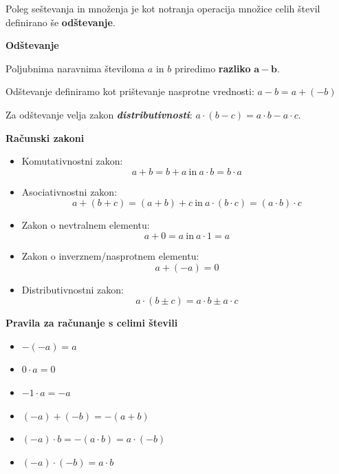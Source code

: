         \begin{frame}

            Poleg seštevanja in množenja je kot notranja operacija množice celih števil
            definirano še \textbf{odštevanje}.

            \bigskip
            \textbf{\large{Odštevanje}}
            
            \bigskip
            Poljubnima naravnima številoma $a$ in $b$ priredimo \textbf{razliko} $\mathbf{a - b}$.
            
            \bigskip
            Odštevanje definiramo kot prištevanje nasprotne vrednosti: $a-b = a+(-b)$

            \bigskip
            Za odštevanje velja zakon \textit{\textbf{distributivnosti}}: $a \cdot (b-c) = a \cdot b - a
            \cdot c$.

        \end{frame}

        \begin{frame}
            \textbf{\large{Računski zakoni}}

            \smallskip
            \begin{itemize}
                \item Komutativnostni zakon: $$a+b = b+a ~\text{in}~ a \cdot b = b \cdot a$$
                \item Asociativnostni zakon: $$a+(b+c) = (a+b)+c ~\text{in}~ a \cdot (b \cdot c) = (a \cdot b) \cdot c$$
                \item Zakon o nevtralnem elementu: $$a+0 = a ~\text{in}~ a \cdot 1 = a$$
                \item Zakon o inverznem/nasprotnem elementu: $$a+(-a) = 0$$
                \item Distributivnostni zakon: $$a \cdot (b \pm c) = a \cdot b \pm a \cdot c$$
            \end{itemize}


        \end{frame}

        \begin{frame}
            \textbf{\large{Pravila za računanje s celimi števili}}

            \bigskip
            \begin{itemize}
                \item $-(-a)=a$
                \item $0\cdot a=0$
                \item $-1 \cdot a =-a$
                \item $(-a)+(-b)=-(a+b)$
                \item $(-a)\cdot b=-(a\cdot b)=a\cdot (-b)$
                \item $(-a)\cdot(-b)=a\cdot b$
            \end{itemize}
        \end{frame}

